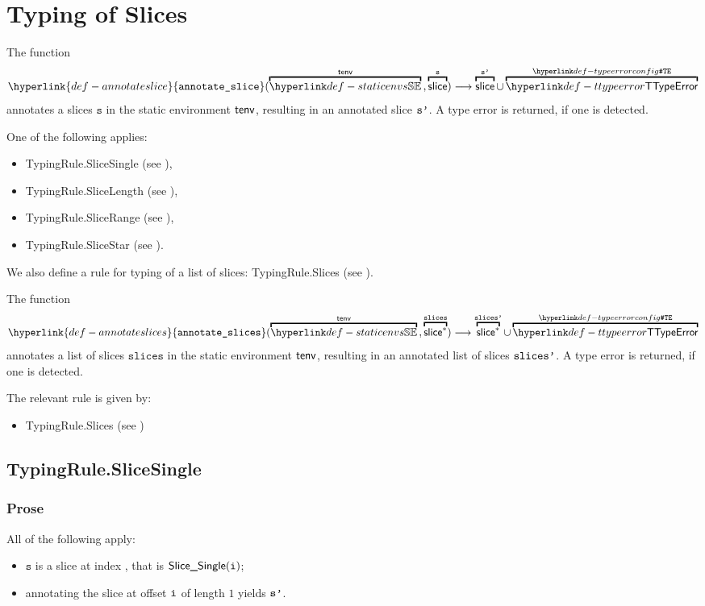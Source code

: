 \documentclass{book}
\newcommand\ProseOrTypeError[0]{\ProseTerminateAs{\TypeErrorConfig}}
\newcommand\annotateslice[0]{\hyperlink{def-annotateslice}{\texttt{annotate\_slice}}}
\newcommand\annotateslices[0]{\hyperlink{def-annotateslices}{\texttt{annotate\_slices}}}
\newcommand\vs[0]{\texttt{s}}
\newcommand\slices[0]{\texttt{slices}}
\begin{document}
\chapter{Typing of Slices \label{chap:typingslices}}
\hypertarget{def-annotateslice}{}
The function
\[
  \annotateslice(\overname{\staticenvs}{\tenv} \aslsep \overname{\slice}{\vs})
  \aslto
  \overname{\slice}{\vsp} \cup \overname{\TTypeError}{\TypeErrorConfig}
\]
annotates a slices $\vs$ in the static environment $\textsf{tenv}$,
resulting in an annotated slice $\texttt{s'}$.
A type error is returned, if one is detected.

One of the following applies:
\begin{itemize}
\item TypingRule.SliceSingle (see ),
\item TypingRule.SliceLength (see ),
\item TypingRule.SliceRange (see ),
\item TypingRule.SliceStar (see ).
\end{itemize}

We also define a rule for typing of a list of slices:
TypingRule.Slices (see ).

\hypertarget{def-annotateslices}{}
The function
\[
  \annotateslices(\overname{\staticenvs}{\tenv} \aslsep \overname{\slice^*}{\slices})
  \aslto
  \overname{\slice^*}{\slicesp} \cup \overname{\TTypeError}{\TypeErrorConfig}
\]
annotates a list of slices $\slices$ in the static environment $\textsf{tenv}$,
resulting in an annotated list of slices $\texttt{slices'}$.
A type error is returned, if one is detected.

The relevant rule is given by:
\begin{itemize}
  \item TypingRule.Slices (see )
\end{itemize}

\section{TypingRule.SliceSingle \label{sec:TypingRule.SliceSingle}}

\subsection{Prose}
All of the following apply:
\begin{itemize}
  \item $\vs$ is a slice at index \vi, that is $\textsf{Slice\_Single}(\texttt{i})$;
  \item annotating the slice at offset $\texttt{i}$ of length $1$ yields $\texttt{s'}$\ProseOrTypeError.
\end{itemize}
\end{document}
